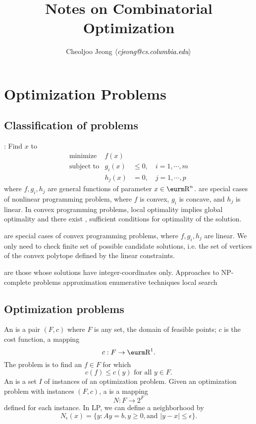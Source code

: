 \documentclass{myproc}
\begin{document}
\title{\large\bf Notes on Combinatorial Optimization \vspace*{-0.5cm}}
\author{\normalsize{}Cheoljoo Jeong $\mbox{$\langle{\textit{\mbox{cjeong@cs.columbia.edu}}}\rangle$}$}
\maketitle
\small
\small
\section{Optimization Problems}
\subsection{Classification of problems}
\bit
\w {}: Find $x$ to
	\begin{eqnarray*}
	\mbox{minimize} & f(x) & \\
	\mbox{subject to} & g_i(x) & \le 0, \quad i = 1, \cdots, m \\
	& h_j(x) & = 0, \quad j = 1, \cdots, p
	\end{eqnarray*}
where $f, g_i, h_j$ are general functions of parameter $x \in \R^n$.
\w {} 
are special cases of nonlinear programming problem, where
 $f$ is convex, $g_i$ is concave, and $h_j$ is linear.
In convex programming problems, local optimality implies global optimality
and there exist , sufficient conditions for
optimality of the solution.

\w {} are special cases of convex programming
problems, where $f, g_i, h_j$ are linear.
We only need to check finite set of possible candidate solutions, i.e.
the set of
vertices of the convex polytope defined by the linear constraints.

\w {} are those whose
solutions have integer-coordinates only.
\w Approaches to NP-complete problems
	\ben
	\w [(a)] approximation
	\w [(b)] enumerative techniques
	\w [(c)] local search
	\een
\eit
\subsection{Optimization problems}
\bit
\w An  is a pair $(F, c)$ where
$F$ is any set, the domain of feasible points; $c$ is the cost
function, a mapping 
	\[ c: F \rightarrow \R^1. \]
The problem is to find an $f \in F$ for which
	\[ c(f) \le c(y) \mbox{\ for all\ } y \in F. \]
\w An  is a set $I$ of instances of an
optimization problem. 
\w Given an optimization problem with instances $(F, c)$, a
 is a mapping 
	\[ N: F \rightarrow 2^F \]
defined for each instance.
	\bit
	\w In LP, we can define a neighborhood by
	\[ N_\epsilon(x) = \{y: Ay = b, y \ge 0, \mbox{and\ } |y - x|
\le \epsilon\}.\] 
	\eit
\eit
\end{document}
